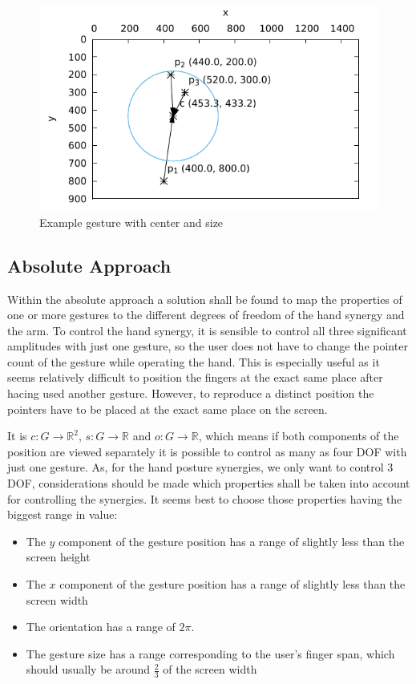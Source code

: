 \begin{figure}
	\caption{\label{fig:touch:expl_res}Example gesture with center and size}
	\includegraphics{assets/chpt_concepts/gestures/3pointers_center.pdf}
\end{figure}

\subsection{Absolute Approach}
\label{sec:synergies:absolute}

Within the absolute approach a solution shall be found to map the properties of one or more gestures to the different degrees of freedom of the hand synergy and the arm. To control the hand synergy, it is sensible to control all three significant amplitudes with just one gesture, so the user does not have to change the pointer count of the gesture while operating the hand. This is especially useful as it seems relatively difficult to position the fingers at the exact same place after hacing used another gesture. However, to reproduce a distinct position the pointers have to be placed at the exact same place on the screen.

It is $c:G\rightarrow\mathbb{R}^2$, $s:G\rightarrow\mathbb{R}$ and $o:G\rightarrow\mathbb{R}$, which means if both components of the position are viewed separately it is possible to control as many as four DOF with just one gesture. As, for the hand posture synergies, we only want to control 3 DOF, considerations should be made which properties shall be taken into account for controlling the synergies. It seems best to choose those properties having the biggest range in value:
\begin{itemize}
	\item The $y$ component of the gesture position has a range of slightly less than the screen height
	\item The $x$ component of the gesture position has a range of slightly less than the screen width
	\item The orientation has a range of $2\pi$.
	\item The gesture size has a range corresponding to the user's finger span, which should usually be around $\frac{2}{3}$ of the screen width
\end{itemize}

